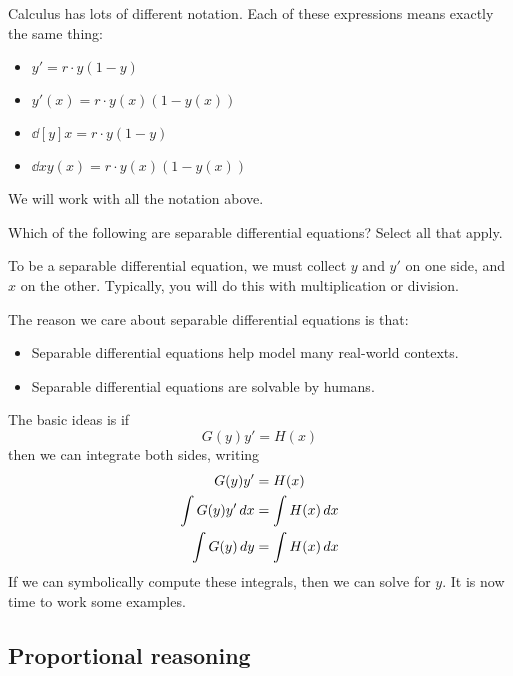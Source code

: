 \documentclass{ximera}
\begin{document}
\begin{warning}
  Calculus has lots of different notation. Each of these expressions
  means exactly the same thing:
  \begin{itemize}
  \item $y' = r\cdot y(1-y)$
  \item $y'(x) = r\cdot y(x)(1-y(x))$
  \item $\dd[y]{x} = r \cdot y(1-y)$
  \item $\dd{x} y(x) = r\cdot y(x) (1-y(x))$
  \end{itemize}
  We will work with all the notation above.
\end{warning}

\begin{question}
  Which of the following are separable differential equations?  Select all that apply.
  \begin{selectAll}
  \end{selectAll}
  \begin{hint}
    To be a separable differential equation, we must collect $y$ and
    $y'$ on one side, and $x$ on the other. Typically, you will do
    this with multiplication or division.
  \end{hint}
\end{question}

The reason we care about separable differential equations is that:
\begin{itemize}
\item Separable differential equations help model many real-world contexts.
\item Separable differential equations are solvable by humans.
\end{itemize}
The basic ideas is if
\[
G(y)y' = H(x)
\]
then we can integrate both sides, writing
\begin{align*}
  G(y)y'  &= H(x)\\
  \int G(y) y' \mathop{}\!d x &= \int H(x) \mathop{}\!d x\\
  \int G(y) \mathop{}\!d y &= \int H(x) \mathop{}\!d x
\end{align*}
If we can symbolically compute these integrals, then we can solve for
$y$. It is now time to work some examples. 


\subsection{Proportional reasoning}
\end{document}
